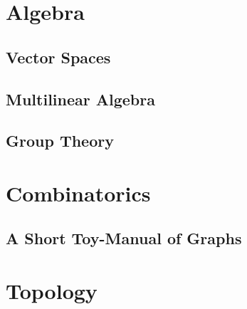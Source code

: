 

\part{Algebra}

\chapter{Vector Spaces}










\chapter{Multilinear Algebra}







\chapter{Group Theory}






\part{Combinatorics}

\chapter{A Short Toy-Manual of Graphs}







\part{Topology}

